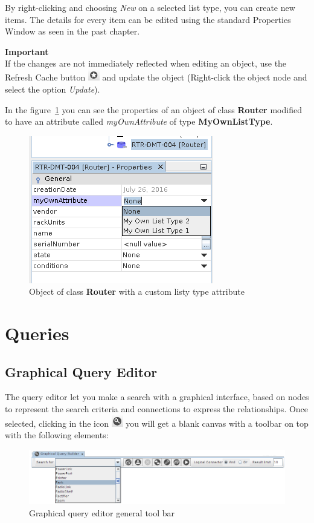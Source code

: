\documentclass[a4paper]{article}
\begin{document}
	 By right-clicking and choosing \textit{New} on a selected list type, you can create new items. The details for every item can be edited using the standard Properties Window as seen in the past chapter. 
	 \newpage
	 \begin{framed} {\large \textbf{Important}}\\
	 	If the changes are not immediately reflected when editing an object, use the Refresh Cache button  \includegraphics[width=0.5cm]{img/icon_refresh_cache.png} and update the object (Right-click the object node and select the option \textit{Update}).
	 \end{framed}
	 
	 In the figure~\ref{fig:list_type_applied_types} you can see the properties of an object of class \textbf{Router} modified to have an attribute called \textit{myOwnAttribute} of type \textbf{MyOwnListType}.\newline
	 \begin{figure}[h!]
	 	\centering
	 	\includegraphics[width=0.4\linewidth]{img/list_type_applied_types.png}
	 	\caption{Object of class \textbf{Router} with a custom listy type attribute}
	 	\label{fig:list_type_applied_types}
	 \end{figure}
	 
	\newpage	
	\section{Queries} \label{sec:querying}
	\subsection{Graphical Query Editor} 
	The query editor let you make a search with a graphical interface, based on nodes to represent the search criteria and connections to express the relationships. Once selected, clicking in the icon \includegraphics[width=0.5cm]{img/icon_query_manager.png} you will get a blank canvas with a toolbar on top with the following elements:
	\begin{figure}[h!]
		\centering
		\includegraphics[width=1.1\linewidth]{img/query_tool_bar.png}
		\caption{Graphical query editor general tool bar}
		\label{fig:query_tool_bar}
	\end{figure}
	
\end{document}
